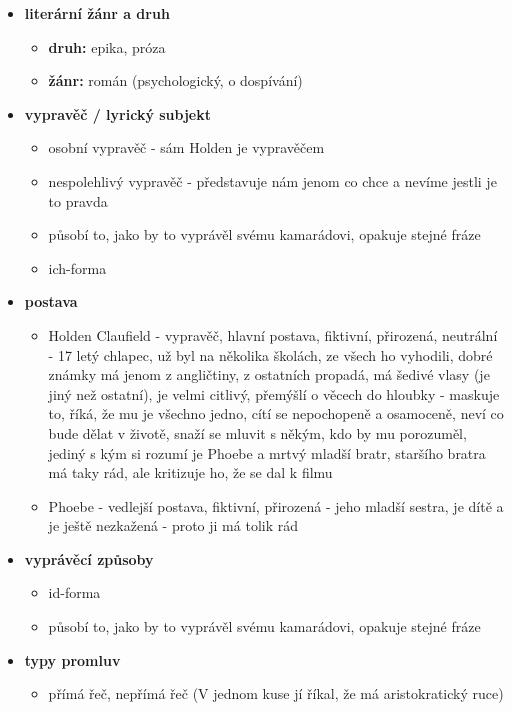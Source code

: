 \documentclass[11pt]{article}
\begin{document}
\begin{itemize}
        \item\textbf{literární žánr a druh}
        \begin{itemize}
            \item\textbf{druh: }epika, próza
            \item\textbf{žánr: }román (psychologický, o dospívání)
        \end{itemize}
        \item\textbf{vypravěč / lyrický subjekt}
        \begin{itemize}
            \item osobní vypravěč - sám Holden je vypravěčem
            \item nespolehlivý vypravěč - představuje nám jenom co chce a nevíme jestli je to pravda
            \item působí to, jako by to vyprávěl svému kamarádovi, opakuje stejné fráze
            \item ich-forma
        \end{itemize}
        \item\textbf{postava}
        \begin{itemize}
            \item Holden Claufield - vypravěč, hlavní postava, fiktivní, přirozená, neutrální - 17 letý chlapec, už byl na několika školách, ze všech ho vyhodili, dobré známky má jenom z angličtiny, z ostatních propadá, má šedivé vlasy (je jiný než ostatní), je velmi citlivý, přemýšlí o věcech do hloubky - maskuje to, říká, že mu je všechno jedno, cítí se nepochopeně a osamoceně, neví co bude dělat v životě, snaží se mluvit s někým, kdo by mu porozuměl, jediný s kým si rozumí je Phoebe a mrtvý mladší bratr, staršího bratra má taky rád, ale kritizuje ho, že se dal k filmu
            \item Phoebe - vedlejší postava, fiktivní, přirozená - jeho mladší sestra, je dítě a je ještě nezkažená - proto ji má tolik rád
        \end{itemize}
        \item\textbf{vyprávěcí způsoby}
        \begin{itemize}
            \item id-forma
            \item působí to, jako by to vyprávěl svému kamarádovi, opakuje stejné fráze
        \end{itemize}
        \item\textbf{typy promluv}
        \begin{itemize}
            \item přímá řeč, nepřímá řeč (V jednom kuse jí říkal, že má aristokratický ruce)

\end{itemize}
\end{itemize}
\end{document}
